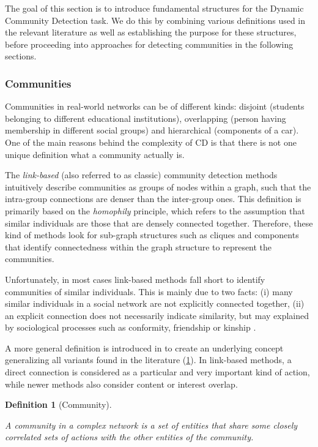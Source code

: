 \documentclass[
acmsmall,
nonacm,
screen,
acmthm]{../../scripts/pandoc/templates/acmart}
\newtheorem{dfn}{Definition}
\begin{document}
The goal of this section is to introduce fundamental structures for the
Dynamic Community Detection task. We do this by combining various
definitions used in the relevant literature as well as establishing the
purpose for these structures, before proceeding into approaches for
detecting communities in the following sections.

\hypertarget{communities}{%
\subsubsection{Communities}\label{communities}}

Communities in real-world networks can be of different kinds: disjoint
(students belonging to different educational institutions), overlapping
(person having membership in different social groups) and hierarchical
(components of a car). One of the main reasons behind the complexity of
CD is that there is not one unique definition what a community actually
is.

The \emph{link-based} (also referred to as classic) community detection
methods intuitively describe communities as groups of nodes within a
graph, such that the intra-group connections are denser than the
inter-group ones. This definition is primarily based on the
\emph{homophily} principle, which refers to the assumption that similar
individuals are those that are densely connected together. Therefore,
these kind of methods look for sub-graph structures such as cliques and
components that identify connectedness within the graph structure to
represent the communities.

Unfortunately, in most cases link-based methods fall short to identify
communities of similar individuals. This is mainly due to two facts: (i)
many similar individuals in a social network are not explicitly
connected together, (ii) an explicit connection does not necessarily
indicate similarity, but may explained by sociological processes such as
conformity, friendship or kinship
\citep{diehlRelationshipIdentificationSocial2007, faniUserCommunityDetection2020}.

A more general definition is introduced in
\citep{cosciaClassificationCommunityDiscovery2011} to create an
underlying concept generalizing all variants found in the literature
(\cref{dfn:community}). In link-based methods, a direct connection is
considered as a particular and very important kind of action, while
newer methods also consider content or interest overlap.

\begin{dfn}[Community]\label{dfn:community} 

A community in a complex network is a set of entities that share some
closely correlated sets of actions with the other entities of the
community.

\end{dfn}
\end{document}
